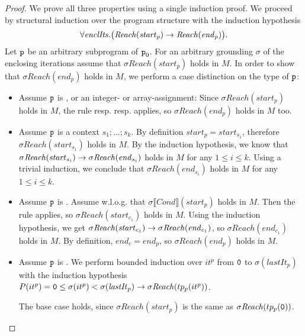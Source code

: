 \begin{proof}
	We prove all three properties using a single induction proof.
	We proceed by structural induction over the program structure with the induction hypothesis $$\forall \mathit{enclIts}. \big(\mathit{Reach}(\mathit{start}_p) \rightarrow \mathit{Reach}(\mathit{end}_p)\big).$$
	Let $\texttt{p}$ be an arbitrary subprogram of $\texttt{p}_0$. For an arbitrary grounding $\sigma$ of the enclosing iterations assume that $\sigma \mathit{Reach}(\mathit{start}_p)$ holds in $M$. 
	In order to show that $\sigma \mathit{Reach}(\mathit{end}_p)$ holds in $M$, 
	we perform a case distinction on the type of $\texttt{p}$:
	\begin{itemize}
		\item Assume $\texttt{p}$ is , or an integer- or array-assignment: Since $\sigma \mathit{Reach}(\mathit{start}_p)$ holds in $M$, the rule  resp.  resp.  applies, so $\sigma \mathit{Reach}(\mathit{end}_p)$ holds in $M$ too.
		\item Assume $\texttt{p}$ is a context $s_1;\dots;s_k$. By definition $\mathit{start_p}=\mathit{start_{s_1}}$, therefore $\sigma \mathit{Reach}(\mathit{start}_{s_1})$ holds in $M$. By the induction hypothesis, we know that
		$\sigma \mathit{Reach}(\mathit{start}_{s_i}) \rightarrow \sigma \mathit{Reach}(\mathit{end}_{s_i})$ holds in $M$ for any $1\leq i \leq k$. Using a trivial induction, we conclude that $\sigma \mathit{Reach}(\mathit{end}_{s_i})$ holds in $M$ for any $1 \leq i \leq k$.
		\item Assume $\texttt{p}$ is . Assume w.l.o.g. that $\sigma\llbracket \mathit{Cond} \rrbracket(\mathit{start}_p)$ holds in $M$. Then the rule  applies, so $\sigma \mathit{Reach}(\mathit{start}_{c_1})$ holds in $M$. Using the induction hypothesis, we get $\sigma \mathit{Reach}(\mathit{start}_{c_1}) \rightarrow \sigma \mathit{Reach}(\mathit{end}_{c_1})$, so $\sigma \mathit{Reach}(\mathit{end}_{c_1})$ holds in $M$. By definition, $\mathit{end}_c=\mathit{end}_p$, so $\sigma\mathit{Reach(\mathit{end}_p)}$ holds in $M$.
		\item Assume $\texttt{p}$ is . 
		We perform  bounded induction over $it^p$ from ${\tt 0}$ to $\sigma(\mathit{lastIt}_p)$ with the induction hypothesis $P(it^p) = {\tt 0} \leq \sigma(it^p) < \sigma(\mathit{lastIt}_p) \rightarrow \sigma\mathit{Reach}(tp_p(it^p))$. 
		
		The base case holds, since $\sigma\mathit{Reach}(\mathit{start}_p)$ is the same as $\sigma\mathit{Reach}(tp_p({\tt 0}))$. 
		

\end{itemize}
\end{proof}
